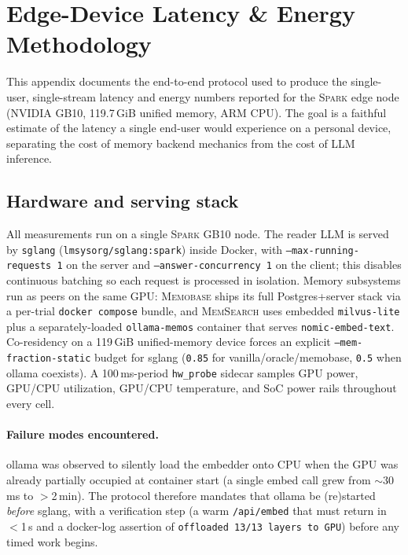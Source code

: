 \section{Edge-Device Latency \& Energy Methodology}
\label{app:latency-methodology}

This appendix documents the end-to-end protocol used to produce the
single-user, single-stream latency and energy numbers reported for the
\textsc{Spark} edge node (NVIDIA GB10, 119.7\,GiB unified memory, ARM CPU).
The goal is a faithful estimate of the latency a single end-user would
experience on a personal device, separating the cost of memory backend
mechanics from the cost of LLM inference.

\subsection{Hardware and serving stack}
\label{app:lat:hardware}

All measurements run on a single \textsc{Spark} GB10 node. The reader LLM is
served by \texttt{sglang} (\texttt{lmsysorg/sglang:spark}) inside Docker, with
\texttt{--max-running-requests 1} on the server and
\texttt{--answer-concurrency 1} on the client; this disables continuous
batching so each request is processed in isolation. Memory subsystems run as
peers on the same GPU: \textsc{Memobase} ships its full Postgres+server stack
via a per-trial \texttt{docker compose} bundle, and \textsc{MemSearch} uses
embedded \texttt{milvus-lite} plus a separately-loaded
\texttt{ollama-memos} container that serves \texttt{nomic-embed-text}.
Co-residency on a 119\,GiB unified-memory device forces an explicit
\texttt{--mem-fraction-static} budget for sglang
(\texttt{0.85} for vanilla/oracle/memobase, \texttt{0.5} when ollama coexists).
A 100\,ms-period \texttt{hw\_probe} sidecar samples GPU power, GPU/CPU
utilization, GPU/CPU temperature, and SoC power rails throughout every cell.

\paragraph{Failure modes encountered.} ollama was observed to silently
load the embedder onto CPU when the GPU was already partially occupied at
container start (a single embed call grew from $\sim$30\,ms to
$>$2\,min). The protocol therefore mandates that ollama be (re)started
\emph{before} sglang, with a verification step (a warm \texttt{/api/embed} that
must return in $<$1\,s and a docker-log assertion of
\texttt{offloaded 13/13 layers to GPU}) before any timed work begins.

